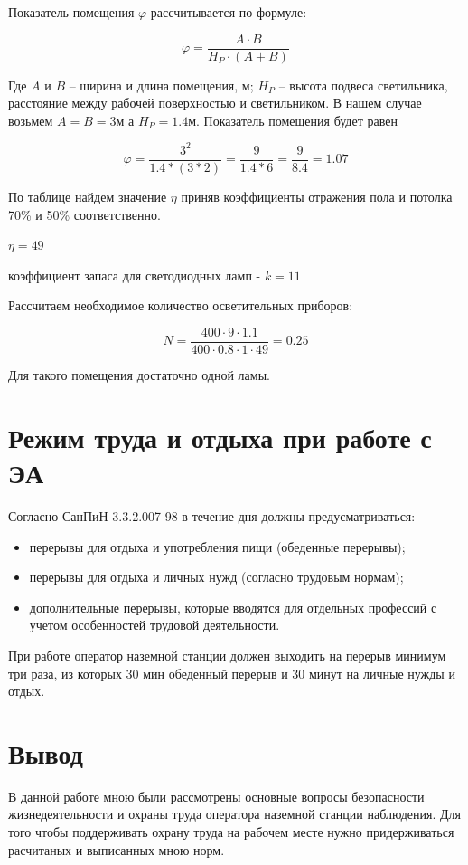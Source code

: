 \documentclass[a4paper,12pt]{report} %
\begin{document}
Показатель помещения $\varphi$ рассчитывается по формуле:

\[
\varphi = \frac{A \cdot B}{H_{P} \cdot (A + B)}
\]

Где $A$ и $B$ -- ширина и длина помещения, м; $H_{P}$ -- высота подвеса
светильника, расстояние между рабочей поверхностью и светильником. В нашем
случае возьмем $A = B = 3\text{м}$ а $H_{P} = 1.4\text{м}$. Показатель помещения
будет равен 

\[
\varphi = \frac{3^2}{1.4*(3*2)} = \frac{9}{1.4*6} = \frac{9}{8.4} = 1.07
\]

По таблице \cite{ledcoef} найдем значение $\eta$ приняв коэффициенты отражения
пола и потолка 70\% и 50\% соответственно.

$\eta = 49$

коэффициент запаса для светодиодных ламп - $k = 11$\cite{ledcoef2}

Рассчитаем необходимое количество осветительных приборов:

\[
N = \frac{ 400 \cdot 9 \cdot 1.1 }{ 400 \cdot 0.8 \cdot 1 \cdot 49 } = 0.25
\]

Для такого помещения достаточно одной ламы.

\section{Режим труда и отдыха при работе с ЭА}

Согласно СанПиН 3.3.2.007-98 в течение дня должны предусматриваться:

\begin{itemize}
\item перерывы для отдыха и употребления пищи (обеденные перерывы);
\item перерывы для отдыха и личных нужд (согласно трудовым нормам);
\item дополнительные перерывы, которые вводятся для отдельных профессий с учетом особенностей трудовой деятельности.
\end{itemize}

При работе оператор наземной станции должен выходить на перерыв минимум три
раза, из которых 30 мин обеденный перерыв и 30 минут на личные нужды и отдых.

\section{Вывод}

В данной работе мною были рассмотрены основные вопросы безопасности
жизнедеятельности и охраны труда оператора наземной станции наблюдения. Для того
чтобы поддерживать охрану труда на рабочем месте нужно придерживаться расчитаных
и выписанных мною норм.
\newpage
\end{document}
